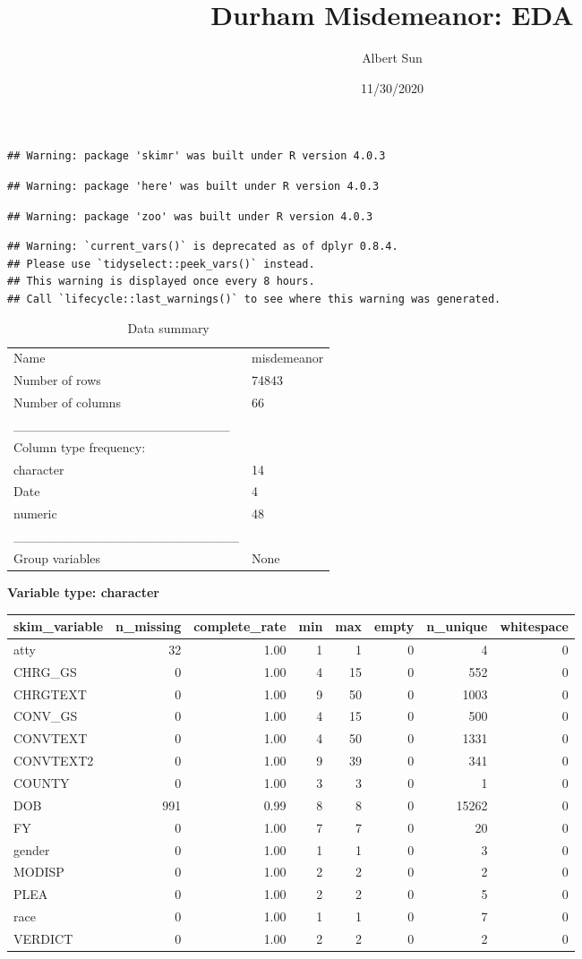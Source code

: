 \documentclass[
]{article}
\title{Durham Misdemeanor: EDA}
\author{Albert Sun}
\date{11/30/2020}
\begin{document}
\maketitle

\begin{verbatim}
## Warning: package 'skimr' was built under R version 4.0.3
\end{verbatim}

\begin{verbatim}
## Warning: package 'here' was built under R version 4.0.3
\end{verbatim}

\begin{verbatim}
## Warning: package 'zoo' was built under R version 4.0.3
\end{verbatim}

\begin{verbatim}
## Warning: `current_vars()` is deprecated as of dplyr 0.8.4.
## Please use `tidyselect::peek_vars()` instead.
## This warning is displayed once every 8 hours.
## Call `lifecycle::last_warnings()` to see where this warning was generated.
\end{verbatim}

\begin{longtable}[]{@{}ll@{}}
\caption{Data summary}\tabularnewline
\toprule
\endhead
Name & misdemeanor\tabularnewline
Number of rows & 74843\tabularnewline
Number of columns & 66\tabularnewline
\_\_\_\_\_\_\_\_\_\_\_\_\_\_\_\_\_\_\_\_\_\_\_ &\tabularnewline
Column type frequency: &\tabularnewline
character & 14\tabularnewline
Date & 4\tabularnewline
numeric & 48\tabularnewline
\_\_\_\_\_\_\_\_\_\_\_\_\_\_\_\_\_\_\_\_\_\_\_\_ &\tabularnewline
Group variables & None\tabularnewline
\bottomrule
\end{longtable}

\textbf{Variable type: character}

\begin{longtable}[]{@{}lrrrrrrr@{}}
\toprule
skim\_variable & n\_missing & complete\_rate & min & max & empty &
n\_unique & whitespace\tabularnewline
\midrule
\endhead
atty & 32 & 1.00 & 1 & 1 & 0 & 4 & 0\tabularnewline
CHRG\_GS & 0 & 1.00 & 4 & 15 & 0 & 552 & 0\tabularnewline
CHRGTEXT & 0 & 1.00 & 9 & 50 & 0 & 1003 & 0\tabularnewline
CONV\_GS & 0 & 1.00 & 4 & 15 & 0 & 500 & 0\tabularnewline
CONVTEXT & 0 & 1.00 & 4 & 50 & 0 & 1331 & 0\tabularnewline
CONVTEXT2 & 0 & 1.00 & 9 & 39 & 0 & 341 & 0\tabularnewline
COUNTY & 0 & 1.00 & 3 & 3 & 0 & 1 & 0\tabularnewline
DOB & 991 & 0.99 & 8 & 8 & 0 & 15262 & 0\tabularnewline
FY & 0 & 1.00 & 7 & 7 & 0 & 20 & 0\tabularnewline
gender & 0 & 1.00 & 1 & 1 & 0 & 3 & 0\tabularnewline
MODISP & 0 & 1.00 & 2 & 2 & 0 & 2 & 0\tabularnewline
PLEA & 0 & 1.00 & 2 & 2 & 0 & 5 & 0\tabularnewline
race & 0 & 1.00 & 1 & 1 & 0 & 7 & 0\tabularnewline
VERDICT & 0 & 1.00 & 2 & 2 & 0 & 2 & 0\tabularnewline
\bottomrule
\end{longtable}
\end{document}
